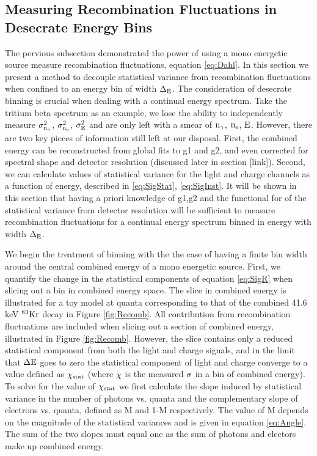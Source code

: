 \subsection{Measuring Recombination Fluctuations in Desecrate Energy Bins}
\label{sec:flucs_mono_bins}

The pervious subsection demonstrated the power of using a mono energetic source measure recombination fluctuations, equation  \ref{eq:Dahl}. In this section we present a method to decouple statistical variance from recombination fluctuations when confined to an energy bin of width $\rm \Delta_E$. The consideration of desecrate binning is crucial when dealing with a continual energy spectrum. Take the tritium beta spectrum as an example, we lose the ability to independently measure $\rm \sigma_{n_\gamma}^2$, $\rm \sigma_{n_e}^2$, $\rm \sigma_{E}^2 $ and are only left with a smear of $\rm n_\gamma$, $\rm n_e$, $\rm E $. However, there are two key pieces of information still left at our disposal. First, the combined energy can be reconstructed from global fits to g1 and g2, and even corrected for spectral shape and detector resolution (discussed later in section [link]). Second, we can calculate values of statistical variance for the light and charge channels as a function of energy, described in \ref{eq:SigStat},  \ref{eq:SigInst}. It will be shown in this section that having a priori knowledge of g1,g2 and the functional for of the statistical variance from detector resolution will be sufficient to measure recombination fluctuations for a continual energy spectrum binned in energy with width $\rm \Delta_E$.


We begin the treatment of binning with the the case of having a finite bin width around the central combined energy of a mono energetic source. First, we quantify the change in the statistical components of equation \ref{eq:SigR} when slicing out a bin in combined energy space. The slice in combined energy is illustrated for a toy model at quanta corresponding to that of the combined 41.6 keV $\rm^{83}Kr$ decay in Figure \ref{fig:Recomb}. All contribution from recombination fluctuations are included when slicing out a section of combined energy, illustrated in Figure \ref{fig:Recomb}. However, the slice contains only a reduced statistical component from both the light and charge signals, and in the limit that $\rm \Delta E$ goes to zero the statistical component of light and charge converge to a value defined as $\rm \chi_{stat}$ (where $\rm \chi$ is the measured $\rm \sigma$ in a bin of combined energy). To solve for the value of  $\rm \chi_{stat}$ we first calculate the slope induced by statistical variance in the number of photons vs. quanta and the complementary slope of electrons vs. quanta, defined as M and 1-M respectively.  The value of M depends on the magnitude of the statistical variances and is given in equation \ref{eq:Angle}. The sum of the two slopes must equal one as the sum of photons and electors make up combined energy.


